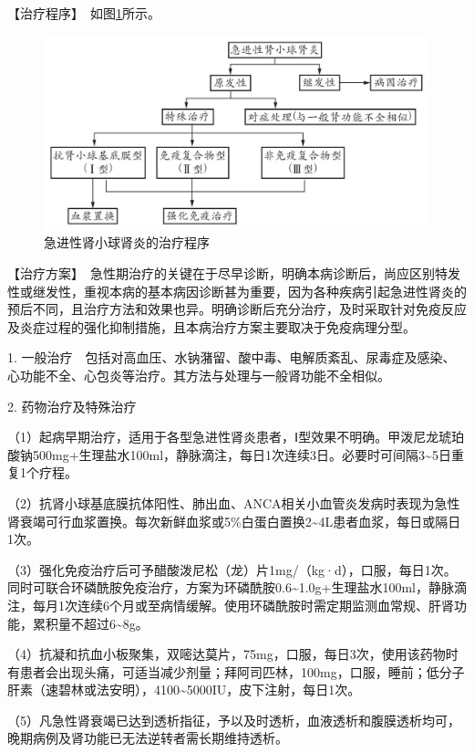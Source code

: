 【治疗程序】　如图\ref{fig4-1-2}所示。

\begin{figure}[!htbp]
 \centering
 \includegraphics{./images/Image00121.jpg}
 \captionsetup{justification=centering}
 \caption{急进性肾小球肾炎的治疗程序}
 \label{fig4-1-2}
  \end{figure} 

【治疗方案】　急性期治疗的关键在于尽早诊断，明确本病诊断后，尚应区别特发性或继发性，重视本病的基本病因诊断甚为重要，因为各种疾病引起急进性肾炎的预后不同，且治疗方法和效果也异。明确诊断后充分治疗，及时采取针对免疫反应及炎症过程的强化抑制措施，且本病治疗方案主要取决于免疫病理分型。

1.
一般治疗　包括对高血压、水钠潴留、酸中毒、电解质紊乱、尿毒症及感染、心功能不全、心包炎等治疗。其方法与处理与一般肾功能不全相似。

2. 药物治疗及特殊治疗

（1）起病早期治疗，适用于各型急进性肾炎患者，Ⅰ型效果不明确。甲泼尼龙琥珀酸钠500mg+生理盐水100ml，静脉滴注，每日1次连续3日。必要时可间隔3\textasciitilde{}5日重复1个疗程。

（2）抗肾小球基底膜抗体阳性、肺出血、ANCA相关小血管炎发病时表现为急性肾衰竭可行血浆置换。每次新鲜血浆或5\%白蛋白置换2\textasciitilde{}4L患者血浆，每日或隔日1次。

（3）强化免疫治疗后可予醋酸泼尼松（龙）片1mg/（kg·d），口服，每日1次。同时可联合环磷酰胺免疫治疗，方案为环磷酰胺0.6\textasciitilde{}1.0g+生理盐水100ml，静脉滴注，每月1次连续6个月或至病情缓解。使用环磷酰胺时需定期监测血常规、肝肾功能，累积量不超过6\textasciitilde{}8g。

（4）抗凝和抗血小板聚集，双嘧达莫片，75mg，口服，每日3次，使用该药物时有患者会出现头痛，可适当减少剂量；拜阿司匹林，100mg，口服，睡前；低分子肝素（速碧林或法安明），4100\textasciitilde{}5000IU，皮下注射，每日1次。

（5）凡急性肾衰竭已达到透析指征，予以及时透析，血液透析和腹膜透析均可，晚期病例及肾功能已无法逆转者需长期维持透析。

